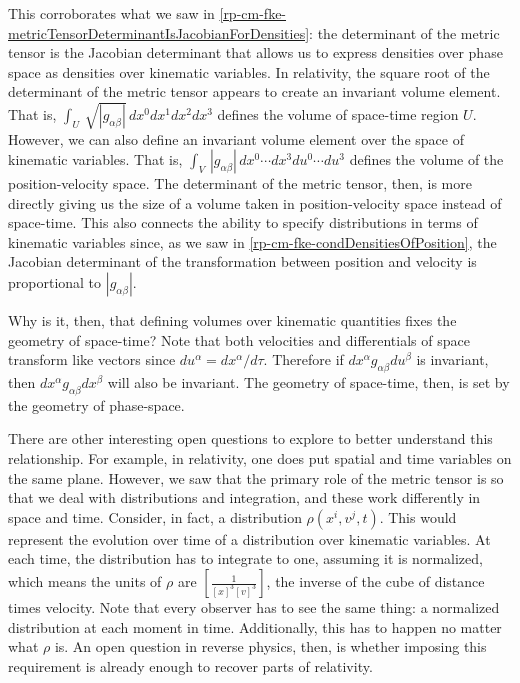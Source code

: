 This corroborates what we saw in \ref{rp-cm-fke-metricTensorDeterminantIsJacobianForDensities}: the determinant of the metric tensor is the Jacobian determinant that allows us to express densities over phase space as densities over kinematic variables. In relativity, the square root of the determinant of the metric tensor appears to create an invariant volume element. That is, $\int_U \, \sqrt{|g_{\alpha\beta}|} \, dx^0 dx^1 dx^2 dx^3$ defines the volume of space-time region $U$. However, we can also define an invariant volume element over the space of kinematic variables. That is, $\int_V \, |g_{\alpha\beta}| \, dx^0 \cdots dx^3 du^0 \cdots du^3$ defines the volume of the position-velocity space. The determinant of the metric tensor, then, is more directly giving us the size of a volume taken in position-velocity space instead of space-time. This also connects the ability to specify distributions in terms of kinematic variables since, as we saw in \ref{rp-cm-fke-condDensitiesOfPosition}, the Jacobian determinant of the transformation between position and velocity is proportional to $|g_{\alpha\beta}|$.

Why is it, then, that defining volumes over kinematic quantities fixes the geometry of space-time? Note that both velocities and differentials of space transform like vectors since $du^\alpha = dx^\alpha / d\tau$. Therefore if $dx^\alpha g_{\alpha\beta} du^\beta$ is invariant, then $dx^\alpha g_{\alpha\beta} dx^\beta$ will also be invariant. The geometry of space-time, then, is set by the geometry of phase-space.

There are other interesting open questions to explore to better understand this relationship. For example, in relativity, one does put spatial and time variables on the same plane. However, we saw that the primary role of the metric tensor is so that we deal with distributions and integration, and these work differently in space and time. Consider, in fact, a distribution $\rho(x^i, v^j, t)$. This would represent the evolution over time of a distribution over kinematic variables. At each time, the distribution has to integrate to one, assuming it is normalized, which means the units of $\rho$ are $\left[\frac{1}{[x]^3[v]^3}\right]$, the inverse of the cube of distance times velocity. Note that every observer has to see the same thing: a normalized distribution at each moment in time. Additionally, this has to happen no matter what $\rho$ is. An open question in reverse physics, then, is whether imposing this requirement is already enough to recover parts of relativity.

